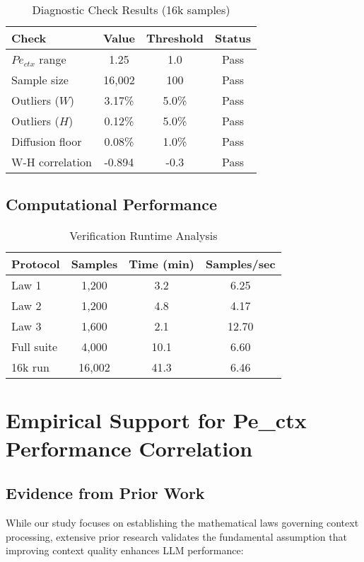 \documentclass[conference]{IEEEtran}
\begin{document}
\begin{table}[h]
\centering
\caption{Diagnostic Check Results (16k samples)}
\label{tab:diagnostics}
\begin{tabular}{@{}lccc@{}}
\toprule
Check & Value & Threshold & Status \\
\midrule
$Pe_{ctx}$ range & 1.25 & 1.0 & Pass \\
Sample size & 16,002 & 100 & Pass \\
Outliers ($W$) & 3.17\% & 5.0\% & Pass \\
Outliers ($H$) & 0.12\% & 5.0\% & Pass \\
Diffusion floor & 0.08\% & 1.0\% & Pass \\
W-H correlation & -0.894 & -0.3 & Pass \\
\bottomrule
\end{tabular}
\end{table}

\subsection{Computational Performance}

\begin{table}[h]
\centering
\caption{Verification Runtime Analysis}
\label{tab:performance}
\begin{tabular}{@{}lccc@{}}
\toprule
Protocol & Samples & Time (min) & Samples/sec \\
\midrule
Law 1 & 1,200 & 3.2 & 6.25 \\
Law 2 & 1,200 & 4.8 & 4.17 \\
Law 3 & 1,600 & 2.1 & 12.70 \\
Full suite & 4,000 & 10.1 & 6.60 \\
16k run & 16,002 & 41.3 & 6.46 \\
\bottomrule
\end{tabular}
\end{table}

\section{Empirical Support for Pe\_ctx Performance Correlation}

\subsection{Evidence from Prior Work}

While our study focuses on establishing the mathematical laws governing context processing, extensive prior research validates the fundamental assumption that improving context quality enhances LLM performance:
\end{document}

